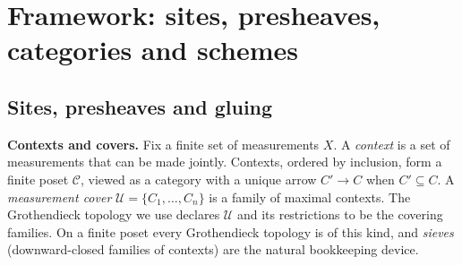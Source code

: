 \documentclass[11pt]{article}
\theoremstyle{definition}
\theoremstyle{remark}
\begin{document}
\section{Framework: sites, presheaves, categories and schemes}\label{sec:framework}
\noindent{}

\subsection{Sites, presheaves and gluing}
\textbf{Contexts and covers.} Fix a finite set of measurements $X$. A \emph{context} is a set of measurements that can be made jointly. Contexts, ordered by inclusion, form a finite poset $\mathcal C$, viewed as a category with a unique arrow $C'\to C$ when $C'\subseteq C$. A \emph{measurement cover} $\mathcal U=\{C_1,\dots,C_n\}$ is a family of maximal contexts. The Grothendieck topology we use declares $\mathcal U$ and its restrictions to be the covering families. On a finite poset every Grothendieck topology is of this kind, and \emph{sieves} (downward-closed families of contexts) are the natural bookkeeping device.
\end{document}
